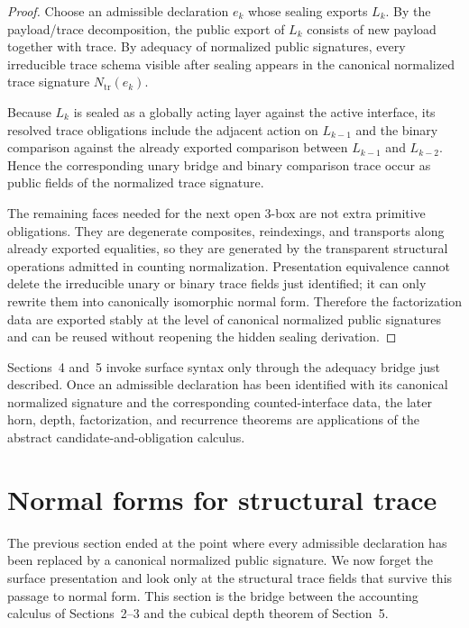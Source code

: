\documentclass{lmcs}
\begin{document}
\begin{proof}
Choose an admissible declaration \(e_k\) whose sealing exports \(L_k\).  By the
payload/trace decomposition, the public export of \(L_k\) consists of new payload together
with trace.  By adequacy of normalized public signatures, every irreducible trace schema
visible after sealing appears in the canonical normalized trace signature
\(N_{\mathrm{tr}}(e_k)\).

Because \(L_k\) is sealed as a globally acting layer against the active interface, its resolved
trace obligations include the adjacent action on \(L_{k-1}\) and the binary comparison against
the already exported comparison between \(L_{k-1}\) and \(L_{k-2}\).  Hence the corresponding
unary bridge and binary comparison trace occur as public fields of the normalized trace
signature.

The remaining faces needed for the next open \(3\)-box are not extra primitive obligations.
They are degenerate composites, reindexings, and transports along already exported equalities,
so they are generated by the transparent structural operations admitted in counting
normalization.  Presentation equivalence cannot delete the irreducible unary or binary trace
fields just identified; it can only rewrite them into canonically isomorphic normal form.
Therefore the factorization data are exported stably at the level of canonical normalized
public signatures and can be reused without reopening the hidden sealing derivation.
\end{proof}

\begin{rem}
Sections~4 and~5 invoke surface syntax only through the adequacy bridge just described.  Once
an admissible declaration has been identified with its canonical normalized signature and the
corresponding counted-interface data, the later horn, depth, factorization, and recurrence
theorems are applications of the abstract candidate-and-obligation calculus.
\end{rem}

\section{Normal forms for structural trace}

The previous section ended at the point where every admissible declaration has been replaced
by a canonical normalized public signature.  We now forget the surface presentation and look
only at the structural trace fields that survive this passage to normal form.  This section is
the bridge between the accounting calculus of Sections~2--3 and the cubical depth theorem of
Section~5.
\end{document}

